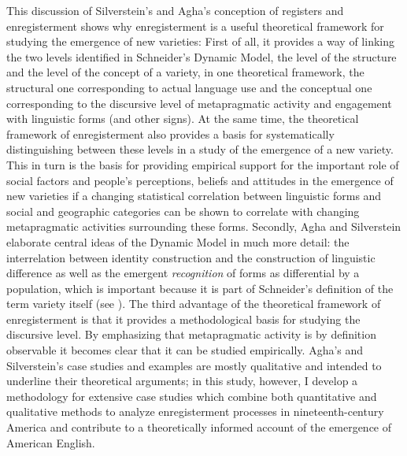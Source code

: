 This discussion of Silverstein’s and Agha’s conception of registers and enregisterment shows why enregisterment is a useful theoretical framework for studying the emergence of new varieties: First of all, it provides a way of linking the two levels identified in Schneider’s Dynamic Model, the level of the structure and the level of the concept of a variety, in one theoretical framework, the structural one corresponding to actual language use and the conceptual one corresponding to the discursive level of metapragmatic activity and engagement with linguistic forms (and other signs). At the same time, the theoretical framework of enregisterment also provides a basis for systematically distinguishing between these levels in a study of the emergence of a new variety. This in turn is the basis for providing empirical support for the important role of social factors and people’s perceptions, beliefs and attitudes in the emergence of new varieties if a changing statistical correlation between linguistic forms and social and geographic categories can be shown to correlate with changing metapragmatic activities surrounding these forms. Secondly, Agha and Silverstein elaborate central ideas of the Dynamic Model in much more detail: the interrelation between identity construction and the construction of linguistic difference as well as the emergent \emph{recognition} of forms as differential by a population, which is important because it is part of Schneider’s definition of the term variety itself (see ). The third advantage of the theoretical framework of enregisterment is that it provides a methodological basis for studying the discursive level. By emphasizing that metapragmatic activity is by definition observable it becomes clear that it can be studied empirically. Agha’s and Silverstein’s case studies and examples are mostly qualitative and intended to underline their theoretical arguments; in this study, however, I develop a methodology for extensive case studies which combine both quantitative and qualitative methods to analyze enregisterment processes in nineteenth-century America and contribute to a theoretically informed account of the emergence of American English.

